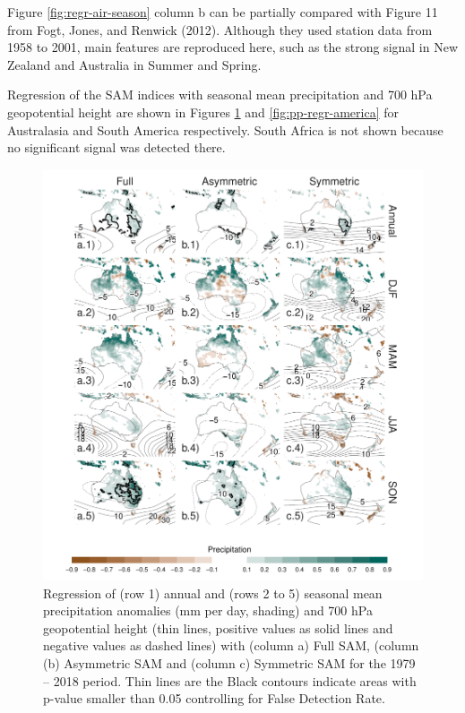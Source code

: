\documentclass[smallextended]{svjour3}       %
\begin{document}
Figure \ref{fig:regr-air-season} column b can be partially compared with Figure 11 from Fogt, Jones, and Renwick (2012). Although they used station data from 1958 to 2001, main features are reproduced here, such as the strong signal in New Zealand and Australia in Summer and Spring.

Regression of the SAM indices with seasonal mean precipitation and 700 hPa geopotential height are shown in Figures \ref{fig:pp-regr-oceania} and \ref{fig:pp-regr-america} for Australasia and South America respectively. South Africa is not shown because no significant signal was detected there.

\begin{figure}
\includegraphics{pp-regr-oceania-1} \caption{Regression of (row 1) annual and (rows 2 to 5) seasonal mean precipitation anomalies (mm per day, shading) and 700 hPa geopotential height (thin lines, positive values as solid lines and negative values as dashed lines) with (column a) Full SAM, (column (b) Asymmetric SAM and (column c) Symmetric SAM for the 1979 -- 2018 period. Thin lines are the Black contours indicate areas with p-value smaller than 0.05 controlling for False Detection Rate.}\label{fig:pp-regr-oceania}
\end{figure}
\end{document}
